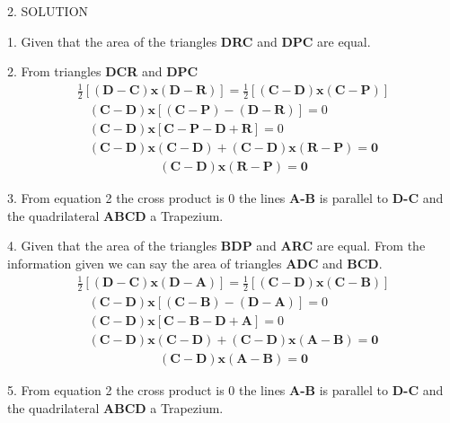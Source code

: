 \documentclass[a4paper,10pt]{report}
\let\vec\mathbf
\begin{document}
\begin{multicols}{2}
\centering \large\textsc{2.  S}\footnotesize\textsc{OLUTION}\vspace{5mm}\\ \raggedright\large 1. Given that the area of the triangles \textbf{DRC} and \textbf{DPC} are equal.\\
\raggedright \large 2. From triangles \textbf{DCR} and \textbf{DPC}
\begin{gather}
 \frac{1}{2} \vec{[(D-C)x(D-R)]} =  \frac{1}{2} \vec{[(C-D)x(C-P)
 ]}
\end{gather}
\begin{align*}
 \vec{(C-D) x [(C-P)-(D-R)]} = 0\\
 \vec{(C-D) x [C-P-D+R]} = 0 \\
 \vec{(C-D) x (C-D) + (C-D) x (R-P) = 0}
\end{align*} 
\begin{align}
\vec{(C-D) x (R-P) = 0}
\end{align}
\raggedright 3. From equation 2 the cross product is 0 the lines \textbf{A-B} is parallel to \textbf{D-C} and the quadrilateral \textbf{ABCD} a Trapezium.\\
\raggedright 4. Given that the area of the triangles \textbf{BDP} and \textbf{ARC} are equal. From the information given we can say the area of triangles \textbf{ADC} and \textbf{BCD}. 
\begin{gather}
\frac{1}{2} \vec{[(D-C)x(D-A)]} =  \frac{1}{2} \vec{[(C-D)x(C-B)]}
\end{gather}
\begin{align*}
 \vec{(C-D) x [(C-B)-(D-A)]} = 0\\
 \vec{(C-D) x [C-B-D+A]} = 0 \\
 \vec{(C-D) x (C-D) + (C-D) x (A-B) = 0}
\end{align*}
\begin{align}
\vec{(C-D) x (A-B) = 0}
\end{align}
\raggedright 5. From equation 2 the cross product is 0 the lines \textbf{A-B} is parallel to \textbf{D-C} and the quadrilateral \textbf{ABCD} a Trapezium.\\


\end{multicols}
\end{document}
